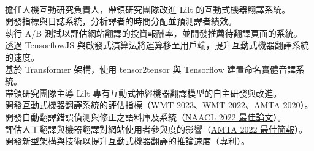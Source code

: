 \vspace{-1mm}

\\
\ifdefined\hci
擔任人機互動研究負責人，帶領研究團隊改進 Lilt 的互動式機器翻譯系統。\\
開發指標與日誌系統，分析譯者的時間分配並預測譯者績效。\\
執行 A/B 測試以評估網站翻譯的投資報酬率，並開發推薦待翻譯頁面的系統。\\
透過 TensorflowJS 與啟發式演算法將運算移至用戶端，提升互動式機器翻譯系統的速度。\\
基於 Transformer 架構，使用 tensor2tensor 與 Tensorflow 建置命名實體音譯系統。\\
\else
帶領研究團隊主導 Lilt 專有互動式神經機器翻譯模型的自主研發與改進。\\
開發互動式機器翻譯系統的評估指標（\href{https://aclanthology.org/2023.wmt-1.53.pdf}{WMT 2023}、\href{https://aclanthology.org/2022.wmt-1.75.pdf}{WMT 2022}、\href{https://aclanthology.org/2020.amta-impact.7/}{AMTA 2020}）。\\
開發自動翻譯錯誤偵測與修正之語料庫及系統（\href{https://aclanthology.org/2022.naacl-main.36.pdf}{NAACL 2022 最佳論文}）。\\
評估人工翻譯與機器翻譯對網站使用者參與度的影響（\href{https://aclanthology.org/2022.amta-research.23.pdf}{AMTA 2022 最佳簡報}）。\\
開發新型架構與技術以提升互動式機器翻譯的推論速度（\href{https://patents.google.com/patent/US11900073B2}{專利}）。\\
\fi

\vspace{-1mm}

